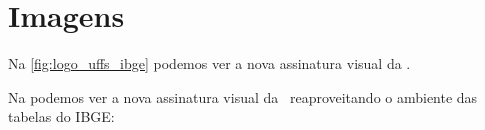 \chapter{Imagens}

Na \autoref{fig:logo_uffs_ibge} podemos ver a nova assinatura visual da \imprimirinstituicao.



Na  podemos ver a nova assinatura visual da \imprimirinstituicao\ reaproveitando o ambiente das tabelas do IBGE:


